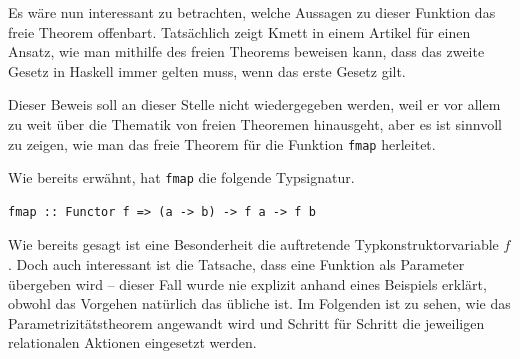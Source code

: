 Es wäre nun interessant zu betrachten, welche Aussagen zu dieser Funktion das freie Theorem offenbart. Tatsächlich zeigt
Kmett in einem Artikel für \cite{schoolofhaskell.com} \cite{fmap} einen Ansatz, wie man mithilfe des freien Theorems beweisen
kann, dass das zweite Gesetz in Haskell immer gelten muss, wenn das erste Gesetz gilt. 

Dieser Beweis soll an dieser Stelle nicht wiedergegeben werden, weil er vor allem zu weit über die Thematik von freien Theoremen
hinausgeht, aber es ist sinnvoll zu zeigen, wie man das freie Theorem für die Funktion \texttt{fmap} herleitet.

Wie bereits erwähnt, hat \texttt{fmap} die folgende Typsignatur.

\begin{verbatim}
fmap :: Functor f => (a -> b) -> f a -> f b
\end{verbatim}

Wie bereits gesagt ist eine Besonderheit die auftretende Typkonstruktorvariable $f$. Doch auch interessant ist die Tatsache, dass
eine Funktion als Parameter übergeben wird -- dieser Fall wurde nie explizit anhand eines Beispiels erklärt, obwohl das Vorgehen
natürlich das übliche ist.
Im Folgenden ist zu sehen, wie das Parametrizitätstheorem angewandt wird und Schritt für Schritt die jeweiligen relationalen Aktionen
eingesetzt werden.


